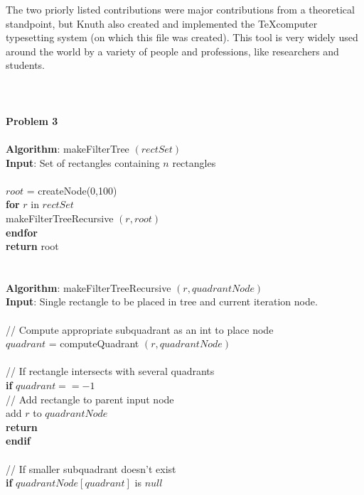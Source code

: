 \documentclass{article}
\begin{document}
	The two priorly listed contributions were major contributions from a theoretical standpoint, but Knuth also created and implemented the \TeX computer typesetting system (on which this file was created). This tool is very widely used around the world by a variety of people and professions, like researchers and students.\\
	\\
	\\
	\pagebreak \\
	\textbf{Problem 3} \\
	\\
	\textbf{Algorithm}: makeFilterTree $(rectSet)$\\
	\textbf{Input}: Set of rectangles containing $n$ rectangles\\
	\\
	\indent $root$ = createNode(0,100) \\
	\indent \textbf{for} $r$ in $rectSet$ \\
	\indent \indent makeFilterTreeRecursive $(r, root)$ \\
	\indent \textbf{endfor} \\
	\indent \textbf{return} root \\ 
	\\
	\\
	\textbf{Algorithm}: makeFilterTreeRecursive $(r, quadrantNode)$ \\ 
	\textbf{Input}: Single rectangle to be placed in tree and current iteration node. \\
	\\ 
	\indent // Compute appropriate subquadrant as an int to place node \\ 
	\indent $quadrant$ = computeQuadrant $(r, quadrantNode)$ \\ 
	\\
	\indent // If rectangle intersects with several quadrants \\
	\indent \textbf{if} $quadrant == -1$ \\
	\indent \indent // Add rectangle to parent input node \\ 
	\indent \indent add $r$ to $quadrantNode$ \\
	\indent \indent \textbf{return} \\
	\indent \textbf{endif} \\
	\\
	\indent // If smaller subquadrant doesn't exist \\ 
	\indent \textbf{if} $quadrantNode[quadrant]$ is $null$ \\
\end{document}
